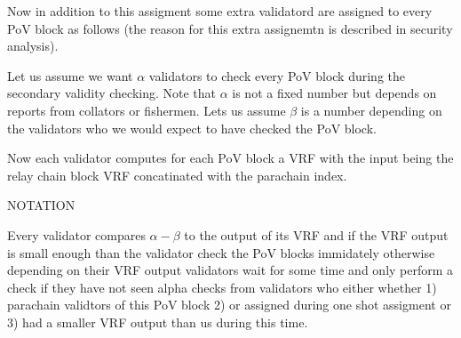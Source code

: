 Now in addition to this assigment some extra validatord are assigned to every PoV block as follows (the reason for this extra assignemtn is described in security analysis).

Let us assume we want $\alpha$ validators to check every PoV block during the secondary validity checking. Note that $\alpha$ is not a fixed number but depends on reports from collators or fishermen. Lets us assume $\beta$ is a number depending on the validators who we would expect to have checked the PoV block.  


Now each validator computes for each PoV block a VRF with the input being the relay chain block VRF concatinated with the parachain index. 

NOTATION

Every validator compares $\alpha - \beta$ to the output of its VRF and if the VRF output is small enough than the validator check the PoV blocks immidately otherwise depending on their VRF output validators wait for some time and only perform a check if they have not seen alpha checks from validators who either whether 1) parachain validtors of this PoV block 2) or assigned during one shot assigment or 3) had a smaller VRF output than us during this time. 
